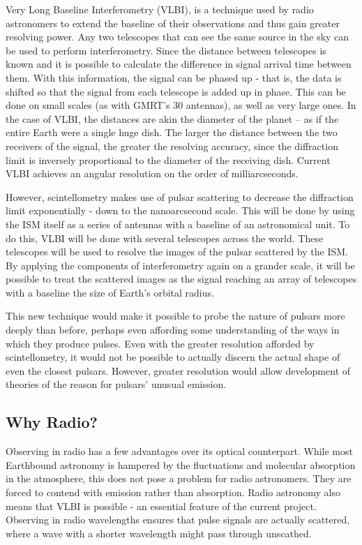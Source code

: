 \documentclass[a4paper,12pt]{article}
\begin{document}
Very Long Baseline Interferometry (VLBI), is a technique used by radio astronomers to extend the baseline of their observations and thus gain greater resolving power. Any two telescopes that can see the same source in the sky can be used to perform interferometry. Since the distance between telescopes is known and it is possible to calculate the difference in signal arrival time between them. With this information, the signal can be phased up - that is, the data is shifted so that the signal from each telescope is added up in phase. This can be done on small scales (as with GMRT's 30 antennas), as well as very large ones. In the case of VLBI, the distances are akin the diameter of the planet – as if the entire Earth were a single huge dish. The larger the distance between the two receivers of the signal, the greater the resolving accuracy, since the diffraction limit is inversely proportional to the diameter of the receiving dish. Current VLBI achieves an angular resolution on the order of milliarcseconds. 

However, scintellometry makes use of pulsar scattering to decrease the diffraction limit exponentially - down to the nanoarcsecond scale. This will be done by using the ISM itself as a series of antennas with a baseline of an astronomical unit. To do this, VLBI will be done with several telescopes across the world. These telescopes will be used to resolve the images of the pulsar scattered by the ISM. By applying the components of interferometry again on a grander scale, it will be possible to treat the scattered images as the signal reaching an array of telescopes with a baseline the size of Earth's orbital radius.

This new technique would make it possible to probe the nature of pulsars more deeply than before, perhaps even affording some understanding of the ways in which they produce pulses. Even with the greater resolution afforded by scintellometry, it would not be possible to actually discern the actual shape of even the closest pulsars. However, greater resolution would allow development of theories of the reason for pulsars' unusual emission.

\subsection{Why Radio?}
\label{sec:radio}

Observing in radio has a few advantages over its optical counterpart. While most Earthbound astronomy is hampered by the fluctuations and molecular absorption in the atmosphere, this does not pose a problem for radio astronomers. They are forced to contend with emission rather than absorption. Radio astronomy also means that VLBI is possible - an essential feature of the current project. Observing in radio wavelengths ensures that pulse signals are actually scattered, where a wave with a shorter wavelength might pass through unscathed.
\end{document}
